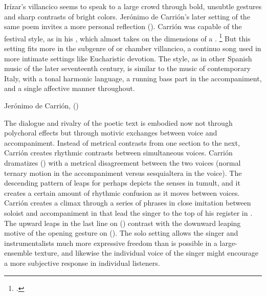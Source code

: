 Irízar's villancico seems to speak to a large crowd through bold, unsubtle
gestures and sharp contrasts of bright colors.
Jerónimo de Carrión's later setting of the same poem invites a more personal
reflection ().%
    \Autocite[149--152]{Cashner:WLSCM32}
Carrión was capable of the festival style, as in his , which almost takes on the dimensions of a .%
    \footnote{.}
But this setting fits more in the subgenre of  or chamber
villancico, a continuo song used in more intimate settings like Eucharistic
devotion.%
    \Autocite[See, for example][]{Robledo:MadridTonos}
The style, as in other Spanish music of the later seventeenth century, is
similar to the  music of contemporary Italy, with a tonal
harmonic language, a running bass part in the accompaniment, and a single
affective manner throughout.


\begin{musicexample}
    \caption{Jerónimo de Carrión,  ()}
    \label{mus:Carrion-Si_los_sentidos}
\end{musicexample}

The dialogue and rivalry of the poetic text is embodied now not through
polychoral effects but through motivic exchanges between voice and
accompaniment.
Instead of metrical contrasts from one section to the next, Carrión creates
rhythmic contrasts between simultaneous voices.
Carrión dramatizes  () with a metrical disagreement
between the two voices (normal ternary motion in the accompaniment versus
sesquialtera in the voice).
The descending pattern of leaps for  perhaps
depicts the senses in tumult, and it creates a certain amount of rhythmic
confusion as it moves between voices.
Carrión creates a climax through a series of phrases in close imitation between
soloist and accompaniment in  that lead the singer to the top
of his register in .
The upward leaps in the last line on  ()
contrast with the downward leaping motive of the opening gesture on
 ().
The solo setting allows the singer and instrumentalists much more expressive
freedom than is possible in a large-ensemble texture, and likewise the
individual voice of the singer might encourage a more subjective response in
individual listeners.

